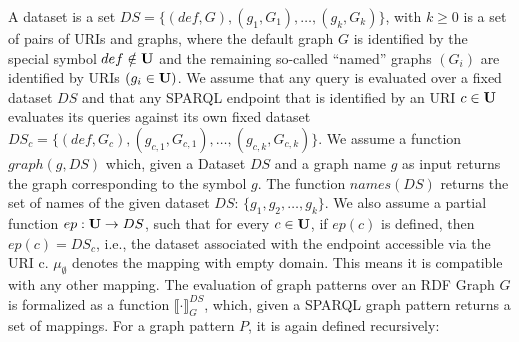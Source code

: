 \begin{definition}
	A dataset is a set $DS = \{(def, G), (g_1,G_1), \dots, (g_k, G_k) \}$, with
	$k\geq 0$ is a set of pairs of URIs and graphs,
	where the default graph $G$ is identified by the special symbol $def \notin \mathbf{U}$
	and the remaining so-called ``named'' graphs $(G_i)$ are identified by URIs
	$(g_i \in \mathbf{U})$. We assume that any query is evaluated over a fixed dataset $DS$
	and that any SPARQL endpoint that is identified by an URI $c \in \mathbf{U}$ evaluates
	its queries against its own fixed dataset 
	$DS_c = \{ (def, G_c),(g_{c,1},G_{c,1}), \dots, (g_{c,k},G_{c,k})\}$.
	We assume a function $graph(g,DS)$ which, given a Dataset $DS$ and a graph name $g$ as
	input returns the graph corresponding to the symbol $g$. The function
	$names(DS)$ returns the set of names of the given dataset $DS$:
	$\{g_1,g_2,\dots,g_k\}$.
	We also assume a partial function $ep: \mathbf{U} \rightarrow DS$, such that for every $c \in
	\mathbf{U}$, if $ep(c)$ is defined, then $ep(c) = DS_c$, i.e., the dataset associated with
	the endpoint accessible via the URI c.
	$\mu_\emptyset$ denotes the mapping with empty domain. This means it is
	compatible with any other mapping.
	The evaluation of graph patterns over an RDF Graph $G$ is formalized as a
	function  $\llbracket \cdot \rrbracket_G^{DS}$, which, given a SPARQL graph pattern
	returns a set of mappings.
	For a graph pattern $P$, it is again defined recursively:
\end{definition}
